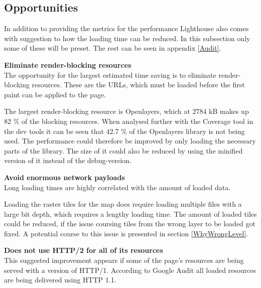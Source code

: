\subsection{Opportunities}
In addition to providing the metrics for the performance Lighthouse also comes with suggestion to how the loading time can be reduced. In this subsection only some of these will be preset. The rest can be seen in appendix \ref{Audit}.

\textbf{Eliminate render-blocking resources}\\
The opportunity for the largest estimated time saving is to eliminate render-blocking resources. These are the URLs, which must be loaded before the first paint can be applied to the page. \citep{RenderBlocking}

The largest render-blocking resource is Openlayers, which at 2784 kB makes up 82 \% of the blocking resources. When analysed further with the Coverage tool in the dev tools it can be seen that 42.7 \% of the Openlayers library is not being used. The performance could therefore be improved by only loading the necessary parts of the library. The size of it could also be reduced by using the minified version of it instead of the debug-version.
 

 

%
%

\textbf{Avoid enormous network payloads}\\
Long loading times are highly correlated with the amount of loaded data.  
\citep{LoadingTooMuch}

Loading the raster tiles for the map does require loading multiple files with a large bit depth, which requires a lengthy loading time. The amount of loaded tiles could be reduced, if the issue coursing tiles from the wrong layer to be loaded got fixed. A potential course to this issue is presented in section \ref{WhyWrongLevel}.

\textbf{Does not use HTTP/2 for all of its resources}\\
This suggested improvement appears if some of the page’s resources are being served with a version of HTTP/1. According to Google Audit all loaded resources are being delivered using HTTP 1.1.
\citep{HTTP2}

